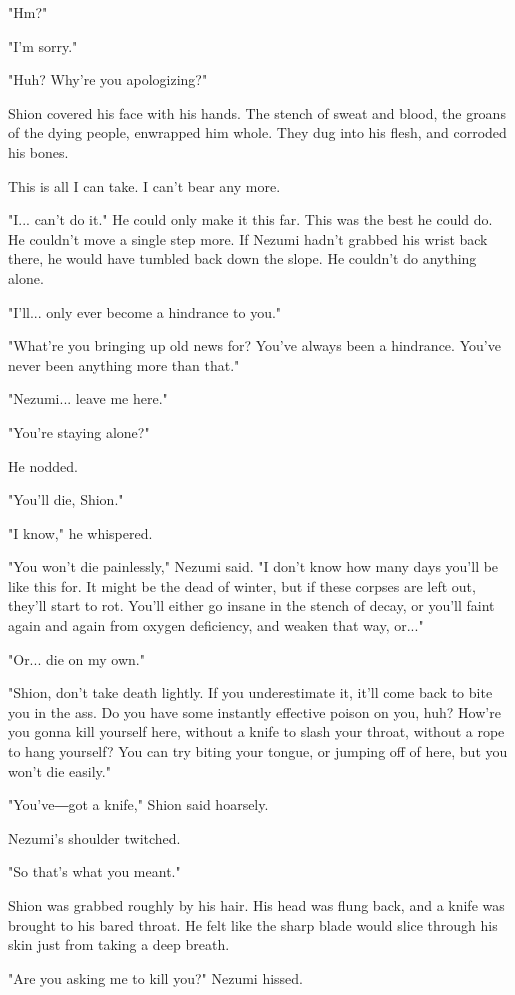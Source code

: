 "Hm?"

"I'm sorry."

"Huh? Why're you apologizing?"

Shion covered his face with his hands. The stench of sweat and blood,
the groans of the dying people, enwrapped him whole. They dug into his
flesh, and corroded his bones.

This is all I can take. I can't bear any more.

"I... can't do it." He could only make it this far. This was the best he
could do. He couldn't move a single step more. If Nezumi hadn't grabbed
his wrist back there, he would have tumbled back down the slope. He
couldn't do anything alone.

"I'll... only ever become a hindrance to you."

"What're you bringing up old news for? You've always been a hindrance.
You've never been anything more than that."

"Nezumi... leave me here."

"You're staying alone?"

He nodded.

"You'll die, Shion."

"I know," he whispered.

"You won't die painlessly," Nezumi said. "I don't know how many days
you'll be like this for. It might be the dead of winter, but if these
corpses are left out, they'll start to rot. You'll either go insane in
the stench of decay, or you'll faint again and again from oxygen
deficiency, and weaken that way, or..."

"Or... die on my own."

"Shion, don't take death lightly. If you underestimate it, it'll come
back to bite you in the ass. Do you have some instantly effective poison
on you, huh? How're you gonna kill yourself here, without a knife to
slash your throat, without a rope to hang yourself? You can try biting
your tongue, or jumping off of here, but you won't die easily."

"You've―got a knife," Shion said hoarsely.

Nezumi's shoulder twitched.

"So that's what you meant."

Shion was grabbed roughly by his hair. His head was flung back, and a
knife was brought to his bared throat. He felt like the sharp blade
would slice through his skin just from taking a deep breath.

"Are you asking me to kill you?" Nezumi hissed.

